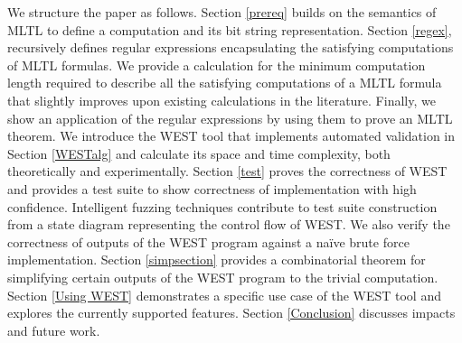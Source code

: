 \documentclass[runningheads]{llncs}
\renewcommand{\phi}{\varphi}
\begin{document}

We structure the paper as follows. Section \ref{prereq} builds on the semantics of MLTL to define a computation and its bit string representation. %
%
Section \ref{regex}, recursively defines regular expressions encapsulating the satisfying computations of MLTL formulas. We provide a calculation for the minimum computation length required to describe all the satisfying computations of a MLTL formula that slightly improves upon existing calculations in the literature. Finally, we show an application of the regular expressions by using them to prove an MLTL theorem.
%
We introduce the WEST tool that implements automated validation in Section \ref{WESTalg}
and calculate its space and time complexity, both theoretically and experimentally. %
%
Section \ref{test} proves the correctness of WEST and provides a test suite to show correctness of implementation with high confidence. Intelligent fuzzing techniques contribute to test suite construction from a state diagram representing the control flow of WEST. We also verify the correctness of outputs of the WEST program against a na\"ive brute force implementation.
%
Section \ref{simpsection} provides a combinatorial theorem for simplifying certain outputs of the WEST program to the trivial computation. %
%
Section \ref{Using WEST} demonstrates a specific use case of the WEST tool and explores the currently supported features. 
%
Section \ref{Conclusion} discusses impacts and future work. 
\end{document}
